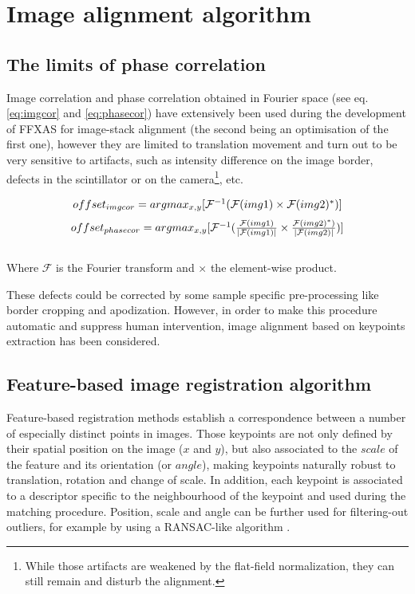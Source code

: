 \documentclass[preprint]{iucr}
\begin{document}
\section{Image alignment algorithm}

\subsection{The limits of phase correlation}

Image correlation and phase correlation obtained in Fourier space (see eq.
\ref{eq:imgcor} and \ref{eq:phasecor}) have
extensively been used during the development of FFXAS for image-stack alignment
(the second being an optimisation of the first one), however they are
limited to translation movement and turn out to be very sensitive to artifacts, such as
intensity difference on the image border, defects in the
scintillator or on the camera\footnote{While those artifacts are weakened by
the flat-field normalization, they can still remain and disturb the alignment.},
etc.

\begin{center}
\begin{equation}
\label{eq:imgcor}
$$offset_{img cor} =
argmax_{x,y}[\mathcal{F}^{-1}(\mathcal{F}(img1)\times\mathcal{F}(img2)^*)]$$
\end{equation}
\begin{equation}
\label{eq:phasecor}
$$offset_{phase cor} =
argmax_{x,y}[\mathcal{F}^{-1}(\frac{\mathcal{F}(img1)}{|\mathcal{F}(img1)|}
\times\frac{\mathcal{F}(img2)^*)}{|\mathcal{F}(img2)|})]$$
\end{equation}
\\Where $\mathcal{F}$ is the Fourier transform and $\times$ the element-wise
product.
\end{center}

These defects could be corrected by some sample
specific pre-processing like border cropping and apodization.
However, in order to make this procedure automatic and suppress human
intervention, image alignment based on keypoints extraction has been
considered.

\subsection{Feature-based image registration algorithm}

Feature-based registration methods establish a correspondence between a
number of especially distinct points in images.
Those keypoints are not only defined by their spatial position on the image
($x$ and $y$), but also associated to the $scale$ of the feature and its
orientation (or $angle$),
making keypoints naturally robust to
translation, rotation and change of scale.
In addition, each keypoint is associated to a descriptor specific to the
neighbourhood of the keypoint and used during the matching procedure. Position,
scale and angle can be further used for filtering-out outliers, for example by
using a RANSAC-like algorithm \cite{orsa}.
\end{document}

